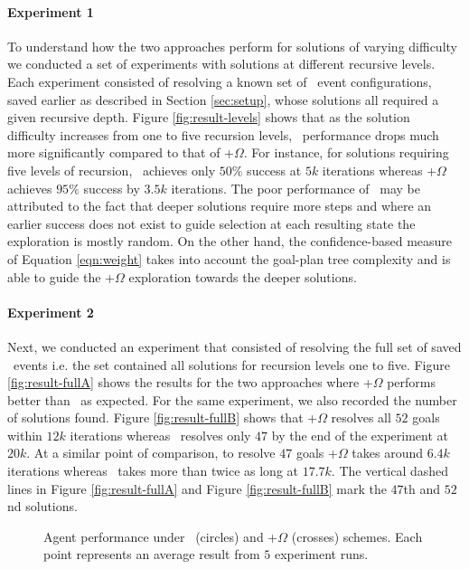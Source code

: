 \paragraph{Experiment 1} To understand how the two approaches perform for solutions of varying difficulty we conducted a set of experiments with solutions at different recursive levels. Each experiment consisted of resolving a known set of \eSolve\  event configurations, saved earlier as described in Section \ref{sec:setup}, whose solutions all required a given recursive depth. Figure \ref{fig:result-levels} shows that as the solution difficulty increases from one to five recursion levels, \CL\ performance drops much more significantly compared to that of \CL+$\Omega$. For instance, for solutions requiring five levels of recursion, \CL\ achieves only $50\%$ success at $5k$ iterations whereas \CL+$\Omega$ achieves $95\%$ success by $3.5k$ iterations. The poor performance of \CL\ may be attributed to the fact that deeper solutions require more  steps and where an earlier success does not exist to guide selection at each resulting state the exploration is mostly random. On the other hand, the confidence-based measure of Equation \ref{eqn:weight} takes into account the goal-plan tree complexity and is able to guide the \CL+$\Omega$ exploration towards the deeper solutions.

\paragraph{Experiment 2} Next, we conducted an experiment that consisted of resolving the full set of saved \eSolve\  events i.e. the set contained all solutions for recursion levels one to five. Figure \ref{fig:result-fullA} shows the results for the two approaches where \CL+$\Omega$ performs better than \CL\ as expected. For the same experiment, we also recorded the number of solutions found. Figure \ref{fig:result-fullB} shows that \CL+$\Omega$ resolves all $52$ goals within $12k$ iterations whereas \CL\ resolves only $47$ by the end of the experiment at $20k$. At a similar point of comparison, to resolve $47$ goals \CL+$\Omega$ takes around $6.4k$ iterations whereas \CL\ takes more than twice as long at $17.7k$. The vertical dashed lines in Figure \ref{fig:result-fullA} and Figure \ref{fig:result-fullB} mark the $47$th and $52$nd solutions.

\begin{figure*}[t]
\begin{center}
\qquad
{}
\caption{Agent performance under \CL\ (circles) and \CL+$\Omega$ (crosses) schemes. Each point represents an average result from $5$ experiment runs.}
\label{fig:result-full}
\end{center}
\end{figure*}

